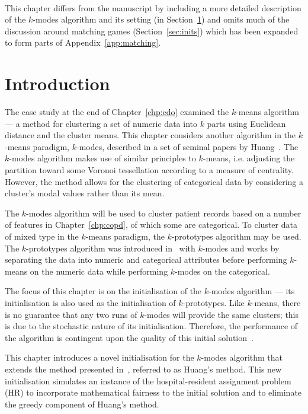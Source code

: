 \myrule\

This chapter differs from the manuscript by including a more detailed
description of the \(k\)-modes algorithm and its setting (in
Section~\ref{sec:kmodes:intro}) and omits much of the discussion around matching
games (Section~\ref{sec:inits}) which has been expanded to form parts of
Appendix~\ref{app:matching}.

\section{Introduction}\label{sec:kmodes:intro}

The case study at the end of Chapter~\ref{chp:edo} examined the \(k\)-means
algorithm --- a method for clustering a set of numeric data into \(k\) parts
using Euclidean distance and the cluster means. This chapter considers another
algorithm in the \(k\)-means paradigm, \(k\)-modes, described in a set of
seminal papers by Huang~\cite{Huang1997a, Huang1997b, Huang1998}. The
\(k\)-modes algorithm makes use of similar principles to \(k\)-means, i.e.
adjusting the partition toward some Voronoi tessellation according to a measure
of centrality. However, the method allows for the clustering of categorical data
by considering a cluster's modal values rather than its mean.

The \(k\)-modes algorithm will be used to cluster patient records based on a
number of features in Chapter~\ref{chp:copd}, of which some are categorical. To
cluster data of mixed type in the \(k\)-means paradigm, the \(k\)-prototypes
algorithm may be used. The \(k\)-prototypes algorithm was introduced
in~\cite{Huang1998} with \(k\)-modes and works by separating the data into
numeric and categorical attributes before performing \(k\)-means on the numeric
data while performing \(k\)-modes on the categorical.

The focus of this chapter is on the initialisation of the \(k\)-modes algorithm
--- its initialisation is also used as the initialisation of \(k\)-prototypes.
Like \(k\)-means, there is no guarantee that any two runs of \(k\)-modes will
provide the same clusters; this is due to the stochastic nature of its
initialisation. Therefore, the performance of the algorithm is contingent upon
the quality of this initial solution~\cite{Huang1998}.

This chapter introduces a novel initialisation for the \(k\)-modes algorithm
that extends the method presented in~\cite{Huang1998}, referred to as Huang's
method. This new initialisation simulates an instance of the hospital-resident
assignment problem (HR) to incorporate mathematical fairness to the initial
solution and to eliminate the greedy component of Huang's method.

